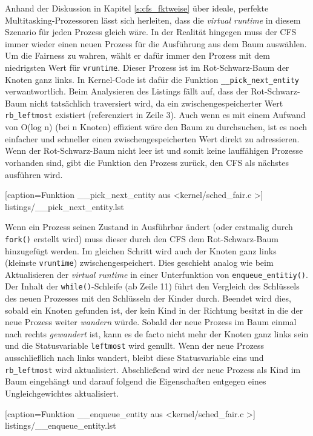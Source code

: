 Anhand der Diskussion in Kapitel \ref{s:cfs_fktweise} über ideale, perfekte Multitasking-Prozessoren lässt sich herleiten, dass die \textit{virtual runtime} in diesem Szenario für jeden Prozess gleich wäre. In der Realität hingegen muss der CFS immer wieder einen neuen Prozess für die Ausführung aus dem Baum auswählen. Um die Fairness zu wahren, wählt er dafür immer den Prozess mit dem niedrigsten Wert für \texttt{vruntime}. Dieser Prozess ist im Rot-Schwarz-Baum der Knoten ganz links. In Kernel-Code ist dafür die Funktion \texttt{\_\_pick\_next\_entity} verwantwortlich. Beim Analysieren des Listings fällt auf, dass der Rot-Schwarz-Baum nicht tatsächlich traversiert wird, da ein zwischengespeicherter Wert \texttt{rb\_leftmost} existiert (referenziert in Zeile 3). Auch wenn es mit einem Aufwand von O(log n) (bei n Knoten) effizient wäre den Baum zu durchsuchen, ist es noch einfacher und schneller einen zwischengespeicherten Wert direkt zu adressieren. Wenn der Rot-Schwarz-Baum nicht leer ist und somit keine lauffähigen Prozesse vorhanden sind, gibt die Funktion den Prozess zurück, den CFS als nächstes ausführen wird.

[caption={Funktion \_\_pick\_next\_entity aus \textless kernel/sched\_fair.c \textgreater}]
{listings/__pick_next_entity.lst}

Wenn ein Prozess seinen Zustand in Ausführbar ändert (oder erstmalig durch \texttt{fork()} erstellt wird) muss dieser durch den CFS dem Rot-Schwarz-Baum hinzugefügt werden. Im gleichen Schritt wird auch der Knoten ganz links (kleinste \texttt{vruntime}) zwischengespeichert. Dies geschieht analog wie beim Aktualisieren der \textit{virtual runtime} in einer Unterfunktion von \texttt{enqueue\_entitiy()}. Der Inhalt der \texttt{while()}-Schleife (ab Zeile 11) führt den Vergleich des Schlüssels des neuen Prozesses mit den Schlüsseln der Kinder durch. Beendet wird dies, sobald ein Knoten gefunden ist, der kein Kind in der Richtung besitzt in die der neue Prozess weiter \textit{wandern} würde. Sobald der neue Prozess im Baum einmal nach rechts \textit{gewandert} ist, kann es de facto nicht mehr der Knoten ganz links sein und die Statusvariable \texttt{leftmost} wird genullt. Wenn der neue Prozess ausschließlich nach links wandert, bleibt diese Statusvariable eins und \texttt{rb\_leftmost} wird aktualisiert. Abschließend wird der neue Prozess als Kind im Baum eingehängt und darauf folgend die Eigenschaften entgegen eines Ungleichgewichtes aktualisiert.

[caption={Funktion \_\_enqueue\_entity aus \textless kernel/sched\_fair.c \textgreater}]
{listings/__enqueue_entity.lst}

